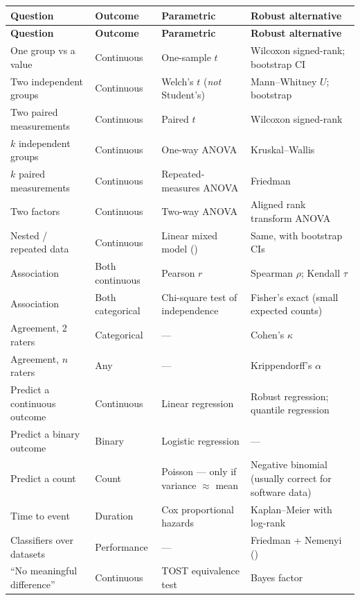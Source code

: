 \begin{center}
\small
\begin{longtable}{@{}L{3.2cm}L{2.6cm}L{4.0cm}L{4.2cm}@{}}
\toprule
\textbf{Question} & \textbf{Outcome} & \textbf{Parametric} & \textbf{Robust alternative} \\
\midrule
\endfirsthead
\toprule
\textbf{Question} & \textbf{Outcome} & \textbf{Parametric} & \textbf{Robust alternative} \\
\midrule
\endhead
\bottomrule
\endfoot
One group vs a value
  & Continuous
  & One-sample $t$
  & Wilcoxon signed-rank; bootstrap CI \\
Two independent groups
  & Continuous
  & Welch's $t$ (\emph{not} Student's)
  & Mann--Whitney $U$; bootstrap \\
Two paired measurements
  & Continuous
  & Paired $t$
  & Wilcoxon signed-rank \\
$k$ independent groups
  & Continuous
  & One-way ANOVA
  & Kruskal--Wallis \\
$k$ paired measurements
  & Continuous
  & Repeated-measures ANOVA
  & Friedman \\
Two factors
  & Continuous
  & Two-way ANOVA
  & Aligned rank transform ANOVA \\
Nested / repeated data
  & Continuous
  & Linear mixed model ()
  & Same, with bootstrap CIs \\
Association
  & Both continuous
  & Pearson $r$
  & Spearman $\rho$; Kendall $\tau$ \\
Association
  & Both categorical
  & Chi-square test of independence
  & Fisher's exact (small expected counts) \\
Agreement, 2 raters
  & Categorical
  & ---
  & Cohen's $\kappa$ \\
Agreement, $n$ raters
  & Any
  & ---
  & Krippendorff's $\alpha$ \\
Predict a continuous outcome
  & Continuous
  & Linear regression
  & Robust regression; quantile regression \\
Predict a binary outcome
  & Binary
  & Logistic regression
  & --- \\
Predict a count
  & Count
  & Poisson --- only if variance $\approx$ mean
  & Negative binomial (usually correct for software data) \\
Time to event
  & Duration
  & Cox proportional hazards
  & Kaplan--Meier with log-rank \\
Classifiers over datasets
  & Performance
  & ---
  & Friedman + Nemenyi () \\
``No meaningful difference''
  & Continuous
  & TOST equivalence test
  & Bayes factor \\
\end{longtable}
\end{center}

